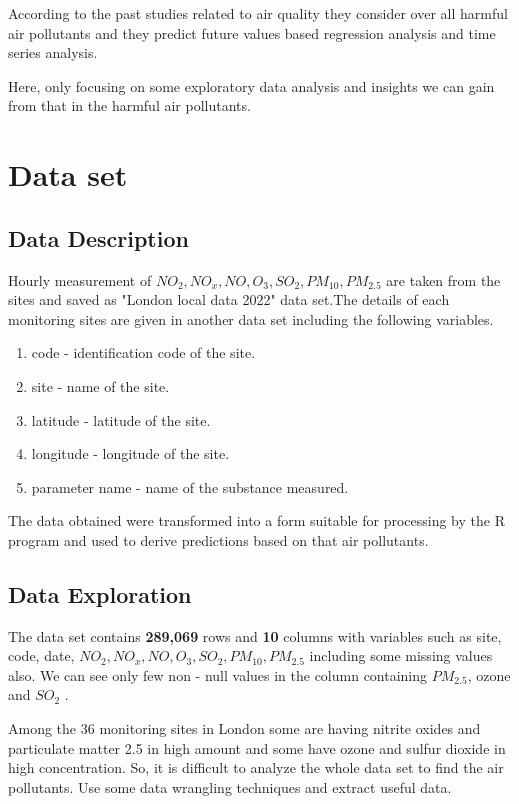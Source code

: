 \documentclass[20pt]{article}
\begin{document}
According to the past studies related to air quality they consider over all harmful air pollutants and they predict future values based regression analysis and time series analysis. 

Here, only focusing on some exploratory data analysis and insights we can gain from that in the harmful air pollutants.

\newpage
\section{Data set}
\subsection{Data Description}
\large Hourly measurement of $NO_2, NO_x, NO, O_3, SO_2, PM_{10}, PM_{2.5}$ are taken from the sites and saved as "London local data 2022" data set.The details of each monitoring sites are given in another data set including the following variables.

\begin{enumerate}
	\item code - identification code of the site.
	\item site - name of the site.
	\item latitude - latitude of the site.
	\item longitude - longitude of the site.
	\item parameter name - name of the substance measured.
\end{enumerate}

The data obtained were transformed into a form suitable for processing by the R program and used to derive predictions based on that air pollutants.

\subsection{Data Exploration}
\large
The data set contains \textbf{289,069} rows and \textbf{10} columns with variables such as site, code, date, $NO_2, NO_x, NO, O_3, SO_2, PM_{10}, PM_{2.5}$ including some missing values also. We can see only few non - null values in the column containing $PM_{2.5}$, ozone and $SO_2$ . 

Among the 36 monitoring sites in London some are having nitrite oxides and particulate matter 2.5 in high amount and some have ozone and sulfur dioxide in high concentration. So, it is difficult to analyze the whole data set to find the air pollutants. Use some data wrangling techniques and extract useful data.
\end{document}
